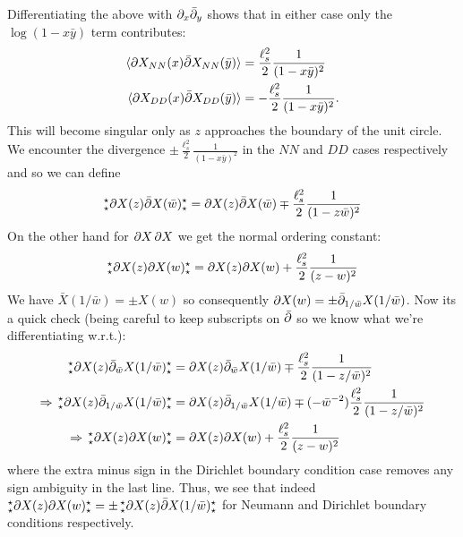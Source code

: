 \documentclass[11pt]{article}
\begin{document}
\begin{enumerate}
	Differentiating the above with $\partial_x \bar {\partial}_y$ shows that in either case only the $\log(1-x \bar y)$ term contributes:
	\[
	\begin{aligned}
		\braket{\partial X_{NN}(x) \bar {\partial} X_{NN}(\bar y)} &= \frac{\ell_s^2}{2} \frac{1}{(1- x \bar y)^2}\\
		\braket{\partial X_{DD}(x) \bar {\partial} X_{DD}(\bar y)} &= -\frac{\ell_s^2}{2} \frac{1}{(1- x \bar y)^2}.
	\end{aligned}
	\]
	This will become singular only as $z$ approaches the boundary of the unit circle. We encounter the divergence $\pm \frac{\ell_s^2}{2} \frac{1}{(1 - x \bar y)^2}$ in the $NN$ and $DD$ cases respectively and so we can define 
	\[
		^\star_\star \partial X(z) \bar {\partial} X(\bar w) ^\star_\star = \partial X(z) \bar {\partial} X(\bar w) \mp \frac{\ell_s^2}{2} \frac{1}{(1 - z \bar w)^2}
	\]
	On the other hand for $\partial X \, \partial X$ we get the normal ordering constant:
	\[
		^\star_\star \partial X(z) \partial X(w) ^\star_\star = \partial X(z) \partial X(w) + \frac{\ell_s^2}{2} \frac{1}{(z - w)^2}
	\]
	We have $\bar X(1/\bar w) = \pm X(w)$ so consequently $\partial X(w) = \pm \bar {\partial}_{1/\bar w} X(1/\bar w)$. Now its a quick check (being careful to keep subscripts on $\bar {\partial}$ so we know what we're differentiating w.r.t.): 
	\[
		\begin{aligned}
			^\star_\star \partial X(z) \bar {\partial}_{\bar w} X(1/\bar w) ^\star_\star &= \partial X(z) \bar {\partial}_{\bar w} X(1/\bar w) \mp \frac{\ell_s^2}{2} \frac{1}{(1 - z/\bar w)^2}\\
			\Rightarrow \, ^\star_\star \partial X(z) \bar {\partial}_{1/\bar w} X(1/\bar w) ^\star_\star &=  \partial X(z) \bar {\partial}_{1/\bar w} X(1/\bar w) \mp (-\bar w^{-2}) \frac{\ell_s^2}{2} \frac{1}{(1-z/\bar w)^2}\\
			\Rightarrow\,  ^\star_\star \partial X(z) \partial X(w) ^\star_\star &= \partial X(z) \partial X(w) + \frac{\ell_s^2}{2} \frac{1}{(z-w)^2}
		\end{aligned}
	\]
	where the extra minus sign in the Dirichlet boundary condition case removes any sign ambiguity in the last line. Thus, we see that indeed $^\star_\star \partial X(z) \partial X(w) ^\star_\star = \pm \, ^\star_\star \partial X(z) \bar {\partial} X(1/\bar w) ^\star_\star $ for Neumann and Dirichlet boundary conditions respectively. 
	

\end{enumerate}
\end{document}
